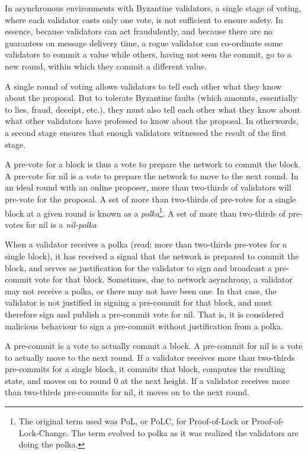 In asynchronous environments with Byzantine validators, 
a single stage of voting, where each validator casts only one vote,
is not sufficient to ensure safety.
In essence, because validators can act fraudulently, 
and because there are no guarantees on message delivery time,
a rogue validator can co-ordinate some validators to commit a value
while others, having not seen the commit, 
go to a new round, within which they commit a different value.

A single round of voting allows validators to tell each other what they know about the proposal.	
But to tolerate Byzantine faults (which amounts, essentially to lies, fraud, deceipt, etc.), 
they must also tell each other what they know about what other validators have professed to know about the proposal.
In otherwords, a second stage ensures that enough validators witnessed the result of the first stage.

A pre-vote for a block is thus a vote to prepare the network to commit the block.
A pre-vote for nil is a vote to prepare the network to move to the next round.
In an ideal round with an online proposer, more than two-thirds of validators will pre-vote for the proposal.
A set of more than two-thirds of pre-votes for a single block at a given round is known as a \emph{polka}\footnote{The original term used was PoL, or PoLC, for Proof-of-Lock or Proof-of-Lock-Change. The term evolved to polka as it was realized the validators are doing the polka.}.
A set of more than two-thirds of pre-votes for nil is a \emph{nil-polka}

When a validator receives a polka (read: more than two-thirds pre-votes for a single block), 
it has received a signal that the network is prepared to commit the block,
and serves as justification for the validator to sign and broadcast a pre-commit vote for that block.
Sometimes, due to network asynchrony, a validator may not receive a polka, or there may not have been one. 
In that case, the validator is not justified in signing a pre-commit for that block, 
and must therefore sign and publish a pre-commit vote for nil.
That is, it is considered malicious behaviour to sign a pre-commit without justification from a polka.

A pre-commit is a vote to actually commit a block.
A pre-commit for nil is a vote to actually move to the next round.
If a validator receives more than two-thirds pre-commits for a single block, 
it commits that block, computes the resulting state,
and moves on to round 0 at the next height.
If a validator receives more than two-thirds pre-commits for nil,
it moves on to the next round.

